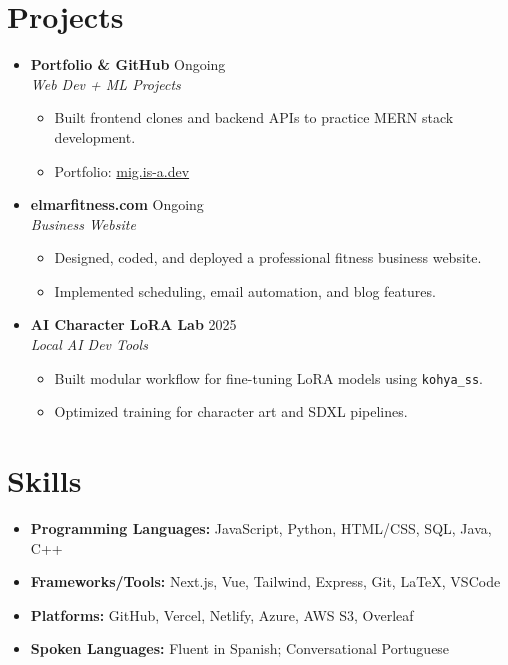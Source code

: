 \documentclass[letterpaper,10pt]{article}
\newcommand{\resumeItem}[1]{\item\small{#1}}
\begin{document}
\section*{Projects}
\begin{itemize}[leftmargin=0.15in]
  \item
    \textbf{Portfolio \& GitHub} \hfill Ongoing \\
    \textit{Web Dev + ML Projects}
    \begin{itemize}
      \resumeItem{Built frontend clones and backend APIs to practice MERN stack development.}
      \resumeItem{Portfolio: \href{https://mig.is-a.dev}{mig.is-a.dev}}
    \end{itemize}

  \item
    \textbf{elmarfitness.com} \hfill Ongoing \\
    \textit{Business Website}
    \begin{itemize}
      \resumeItem{Designed, coded, and deployed a professional fitness business website.}
      \resumeItem{Implemented scheduling, email automation, and blog features.}
    \end{itemize}
    
  \item
    \textbf{AI Character LoRA Lab} \hfill 2025 \\
    \textit{Local AI Dev Tools}
    \begin{itemize}
      \resumeItem{Built modular workflow for fine-tuning LoRA models using \texttt{kohya\_ss}.}
      \resumeItem{Optimized training for character art and SDXL pipelines.}
    \end{itemize}
\end{itemize}


\section*{Skills}
\begin{itemize}[leftmargin=0.15in, label={}]
  \item \textbf{Programming Languages:} JavaScript, Python, HTML/CSS, SQL, Java, C++
  \item \textbf{Frameworks/Tools:} Next.js, Vue, Tailwind, Express, Git, LaTeX, VSCode
  \item \textbf{Platforms:} GitHub, Vercel, Netlify, Azure, AWS S3, Overleaf
  \item \textbf{Spoken Languages:} Fluent in Spanish; Conversational Portuguese
\end{itemize}
\end{document}
